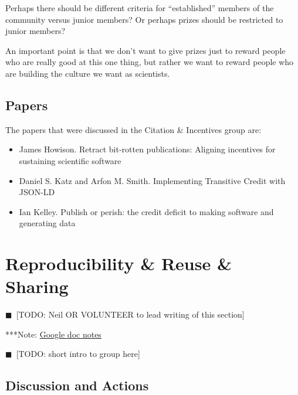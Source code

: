 \documentclass[11pt, oneside]{amsart}
\newcommand{\todo}[1]{{\color{blue}$\blacksquare$~\textsf{[TODO: #1]}}}
\newcommand{\note}[1]{ {\textcolor{blueish}    { ***Note:      #1 }}}
\begin{document}
Perhaps there should be different criteria for ``established'' members of the community versus junior members?  Or perhaps prizes should be restricted to junior members?

An important point is that we don't want to give prizes just to reward people who are really good at this one thing, but rather we want to reward people who are building the culture we want as scientists.

 



\subsection{Papers}
The papers that were discussed in the Citation \& Incentives group are:
\begin{itemize}
\item James Howison. Retract bit-rotten publications: Aligning incentives for
sustaining scientific software~\cite{wssspe2_howison}

\item Daniel S. Katz and Arfon M. Smith. Implementing Transitive Credit with
{JSON-LD}~\cite{wssspe2_katz}

\item Ian Kelley. Publish or perish: the credit deficit to making software and
generating data~\cite{wssspe2_kelley}
\end{itemize}

\section{Reproducibility \& Reuse \& Sharing} \label{sec:reproduce}
\todo{Neil OR VOLUNTEER to lead writing of this section}

\note{\href{http://tinyurl.com/kqpe87z}{Google doc notes}}

\todo{short intro to group here}

\subsection{Discussion and Actions}
\end{document}
